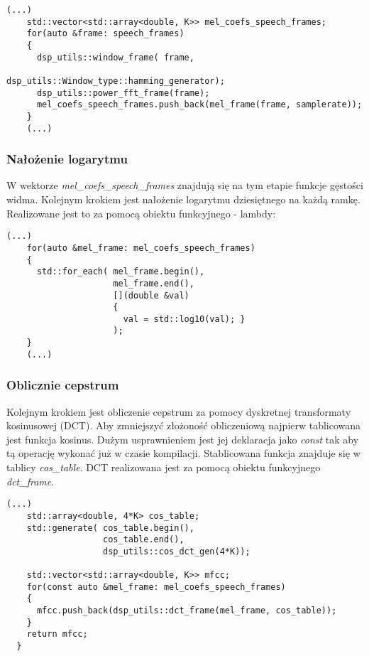 \begin{lstlisting}[style=lst:cpp, caption=funkcja \textit{mfcc\_extraction} - obliczanie widma gęstości mocy\label{lst:mfccpower}]
    (...)
    std::vector<std::array<double, K>> mel_coefs_speech_frames;
    for(auto &frame: speech_frames)
    {
      dsp_utils::window_frame( frame,
                               dsp_utils::Window_type::hamming_generator);
      dsp_utils::power_fft_frame(frame);
      mel_coefs_speech_frames.push_back(mel_frame(frame, samplerate));
    }
    (...)
\end{lstlisting}

\subsubsection{Nałożenie logarytmu}

W wektorze \textit{mel\_coefs\_speech\_frames} znajdują się na tym etapie funkcje gęstości widma. Kolejnym krokiem jest nałożenie logarytmu dziesiętnego na każdą ramkę. Realizowane jest to za pomocą obiektu funkcyjnego - lambdy: 

\begin{lstlisting}[style=lst:cpp, caption=funkcja \textit{mfcc\_extraction} - obliczanie logarytmu widma gęstości mocy \label{lst:mfcclog}]
    (...)
    for(auto &mel_frame: mel_coefs_speech_frames)
    {
      std::for_each( mel_frame.begin(),
                     mel_frame.end(),
                     [](double &val)
                     {
                       val = std::log10(val); }
                     );
    } 
    (...)
\end{lstlisting}

\subsubsection{Oblicznie cepstrum}

Kolejnym krokiem jest obliczenie cepstrum za pomocy dyskretnej transformaty kosinusowej (DCT). Aby zmniejszyć złożoność obliczeniową najpierw tablicowana jest funkcja kosinus. Dużym usprawnieniem jest jej deklaracja jako \textit{const} tak aby tą operację wykonać już w czasie kompilacji. Stablicowana funkcja znajduje się w tablicy \textit{cos\_table}. DCT realizowana jest za pomocą obiektu funkcyjnego \textit{dct\_frame}.
    
\begin{lstlisting}[style=lst:cpp, caption=funkcja \textit{mfcc\_extraction} - obliczanie cepstrum \label{lst:mfcccepstrum}]
    (...)
    std::array<double, 4*K> cos_table;
    std::generate( cos_table.begin(),
                   cos_table.end(),
                   dsp_utils::cos_dct_gen(4*K));

    std::vector<std::array<double, K>> mfcc;
    for(const auto &mel_frame: mel_coefs_speech_frames)
    {
      mfcc.push_back(dsp_utils::dct_frame(mel_frame, cos_table));
    }
    return mfcc;
  }
\end{lstlisting}

